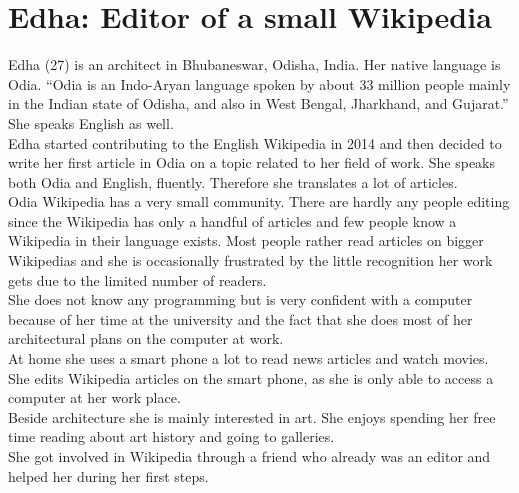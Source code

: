 \section{Edha: Editor of a small Wikipedia}
Edha (27) is an architect in Bhubaneswar, Odisha, India. Her native language is Odia. ``Odia is an Indo-Aryan language spoken by about 33 million people mainly in the Indian state of Odisha, and also in West Bengal, Jharkhand, and Gujarat.'' \citep{odia} She speaks English as well.\\
Edha started contributing to the English Wikipedia in 2014 and then decided to write her first article in Odia on a topic related to her field of work. She speaks both Odia and English, fluently. Therefore she translates a lot of articles. \\
Odia Wikipedia has a very small community. There are hardly any people editing since the Wikipedia has only a handful of articles and few people know a Wikipedia in their language exists. Most people rather read articles on bigger Wikipedias and she is occasionally frustrated by the little recognition her work gets due to the limited number of readers. \\
She does not know any programming but is very confident with a computer because of her time at the university and the fact that she does most of her architectural plans on the computer at work. \\
At home she uses a smart phone a lot to read news articles and watch movies. She edits Wikipedia articles on the smart phone, as she is only able to access a computer at her work place. \\  
Beside architecture she is mainly interested in art. She enjoys spending her free time reading about art history and going to galleries. \\
She got involved in Wikipedia through a friend who already was an editor and helped her during her first steps.

